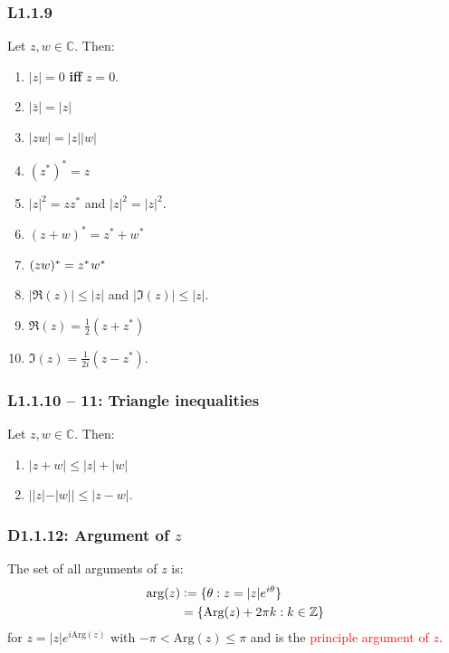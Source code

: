 \documentclass{article}
\newcommand{\deq}{\vcentcolon=}
\begin{document}
\begin{multicols*}{3}
\newcolumn

\subsubsection*{L1.1.9}
Let $z,w\in\mathbb{C}$. Then:
\begin{enumerate}
    \item $|z|=0$ \textbf{if{}f} $z=0$.
    
    \item $|\overline{z}|=|z|$
    
    \item $|zw|=|z||w|$
    
    \item $(z^*)^*=z$
    
    \item $|z|^2=zz^*$ and $|z|^2=|z|^2$.
    
    \item $(z+w)^*=z^*+w^*$
    
    \item $(zw)^*=z^*\hspace{0.01in}w^*$
    
    \item $|\Re(z)|\leq|z|$ and $|\Im(z)|\leq|z|$.
    
    \item $\Re(z)=\frac{1}{2}(z+z^*)$
    
    \item $\Im(z)=\frac{1}{2i}(z-z^*)$.
\end{enumerate}

\subsubsection*{L1.1.10 -- 11: Triangle inequalities}
Let $z,w\in\mathbb{C}$. Then:
\begin{enumerate}
    \item $|z+w|\leq|z|+|w|$
    
    \item $||z|-|w||\leq|z-w|$.
\end{enumerate}

\subsubsection*{D1.1.12: Argument of $z$}
The set of all arguments of $z$ is:
\begin{align*}
    \arg(z)
    &\deq\{\theta:z=|z|e^{i\theta}\} \\
    &=\{\text{Arg}(z)+2\pi k:k\in\mathbb{Z}\}
\end{align*}
for $z=|z|e^{i\text{Arg}(z)}$
with
$-\pi<\text{Arg}(z)\leq\pi$
and is the \textcolor{red}
{principle argument of $z$}.


\end{multicols*}
\end{document}
